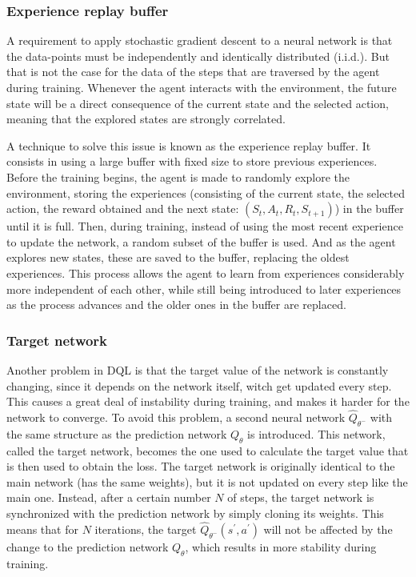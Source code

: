 \subsubsection*{Experience replay buffer}

A requirement to apply stochastic gradient descent to a neural network is that the data-points must be independently and identically distributed (i.i.d.). But that is not the case for the data of the steps that are traversed by the agent during training. Whenever the agent interacts with the environment, the future state will be a direct consequence of the current state and the selected action, meaning that the explored states are strongly correlated.

A technique to solve this issue is known as the experience replay buffer. It consists in using a large buffer with fixed size to store previous experiences. Before the training begins, the agent is made to randomly explore the environment, storing the experiences (consisting of the current state, the selected action, the reward obtained and the next state: $(S_t, A_t, R_t, S_{t+1})$) in the buffer until it is full. Then, during training, instead of using the most recent experience to update the network, a random subset of the buffer is used. And as the agent explores new states, these are saved to the buffer, replacing the oldest experiences. This process allows the agent to learn from experiences considerably more independent of each other, while still being introduced to later experiences as the process advances and the older ones in the buffer are replaced.

\subsubsection*{Target network}

Another problem in DQL is that the target value of the network is constantly changing, since it depends on the network itself, witch get updated every step. This causes a great deal of instability during training, and makes it harder for the network to converge. To avoid this problem, a second neural network $\hat{Q}_{\theta^-}$ with the same structure as the prediction network $Q_\theta$ is introduced. This network, called the target network, becomes the one used to calculate the target value that is then used to obtain the loss. The target network is originally identical to the main network (has the same weights), but it is not updated on every step like the main one. Instead, after a certain number $N$ of steps, the target network is synchronized with the prediction network by simply cloning its weights. This means that for $N$ iterations, the target $\hat{Q}_{\theta^-}(s^\prime, a^\prime)$ will not be affected by the change to the prediction network $Q_\theta$, which results in more stability during training.

